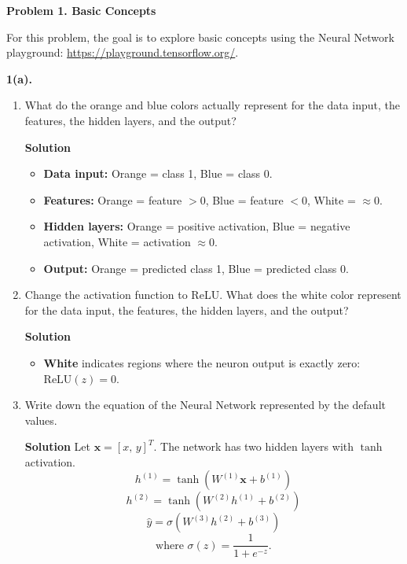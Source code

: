 \documentclass[11pt]{article}
\begin{document}
	
	\noindent\textbf{Problem 1. Basic Concepts}
	
	\vspace{0.5em}
	For this problem, the goal is to explore basic concepts using the Neural Network
	playground: \url{https://playground.tensorflow.org/}.
	
	\vspace{1em}
	\noindent\textbf{1(a).}
	
	\begin{enumerate}[label=1.a.\roman*., leftmargin=1.2cm, itemsep=0.4em]
		\item What do the orange and blue colors actually represent for the data input, the features, the hidden layers, and the output?
		
		\noindent\textbf{Solution} 
		\begin{itemize}
			\item \textbf{Data input:} Orange = class 1, Blue = class 0.
			\item \textbf{Features:} Orange = feature $> 0$, Blue = feature $< 0$, White = $\approx 0$.
			\item \textbf{Hidden layers:} Orange = positive activation, Blue = negative activation, White = activation $\approx 0$.
			\item \textbf{Output:} Orange = predicted class 1, Blue = predicted class 0.
		\end{itemize}
		
		
		\item Change the activation function to ReLU. What does the white color represent for the data input, the features, the hidden layers, and the output?
		
		\noindent\textbf{Solution} 
		\begin{itemize}
			\item \textbf{White} indicates regions where the neuron output is exactly zero: $\text{ReLU}(z) = 0$.
		\end{itemize}
		
		\item Write down the equation of the Neural Network represented by the default values.
		
		\noindent\textbf{Solution}
		Let $\mathbf{x} = [x,\, y]^T$. The network has two hidden layers with $\tanh$ activation.
		\[
		h^{(1)} = \tanh\!\left(W^{(1)} \mathbf{x} + b^{(1)}\right)
		\]
		\[
		h^{(2)} = \tanh\!\left(W^{(2)} h^{(1)} + b^{(2)}\right)
		\]
		\[
		\hat{y} = \sigma\!\left(W^{(3)} h^{(2)} + b^{(3)}\right)
		\]
		\[
		\text{where } \sigma(z) = \frac{1}{1 + e^{-z}}.
		\]
		
	\end{enumerate}
	
\end{document}
